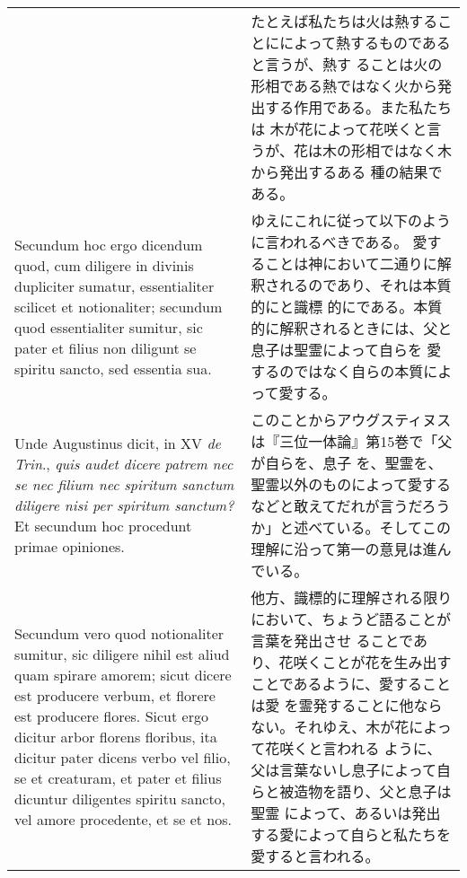 \documentclass[10pt]{jsarticle} %
\begin{document}
\begin{longtable}{p{21em}p{21em}}
&

たとえば私たちは火は熱することにによって熱するものであると言うが、熱す
ることは火の形相である熱ではなく火から発出する作用である。また私たちは
 木が花によって花咲くと言うが、花は木の形相ではなく木から発出するある
 種の結果である。

\\


Secundum hoc ergo dicendum quod, cum diligere in divinis dupliciter
 sumatur, essentialiter scilicet et notionaliter; secundum quod
 essentialiter sumitur, sic pater et filius non diligunt se spiritu
 sancto, sed essentia sua. 


&

ゆえにこれに従って以下のように言われるべきである。
愛することは神において二通りに解釈されるのであり、それは本質的にと識標
 的にである。本質的に解釈されるときには、父と息子は聖霊によって自らを
 愛するのではなく自らの本質によって愛する。

\\


Unde Augustinus dicit, in XV {\itshape de Trin}., {\itshape quis
 audet dicere patrem nec se nec filium nec spiritum sanctum diligere
 nisi per spiritum sanctum?} Et secundum hoc procedunt primae
 opiniones. 

&

このことからアウグスティヌスは『三位一体論』第15巻で「父が自らを、息子
 を、聖霊を、聖霊以外のものによって愛するなどと敢えてだれが言うだろう
 か」と述べている。そしてこの理解に沿って第一の意見は進んでいる。

\\


Secundum vero quod notionaliter sumitur, sic diligere
 nihil est aliud quam spirare amorem; sicut dicere est producere
 verbum, et florere est producere flores. Sicut ergo dicitur arbor
 florens floribus, ita dicitur pater dicens verbo vel filio, se et
 creaturam, et pater et filius dicuntur diligentes spiritu sancto, vel
 amore procedente, et se et nos.



&

他方、識標的に理解される限りにおいて、ちょうど語ることが言葉を発出させ
ることであり、花咲くことが花を生み出すことであるように、愛することは愛
 を霊発することに他ならない。それゆえ、木が花によって花咲くと言われる
 ように、父は言葉ないし息子によって自らと被造物を語り、父と息子は聖霊
 によって、あるいは発出する愛によって自らと私たちを愛すると言われる。

\\


\end{longtable}
\end{document}
